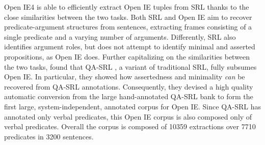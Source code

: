 Open IE4 is able to efficiently extract Open IE tuples from SRL thanks to
the close similarities between the two tasks.
Both SRL and Open IE aim to recover predicate-argument structures from sentences, extracting frames consisting
of a single predicate and a varying number of arguments.
Differently, SRL also identifies argument roles, but does not attempt
to identify minimal and asserted propositions, as Open IE does.
Further capitalizing on the similarities between the two tasks,  found that QA-SRL \cite{hequestion}, a variant of traditional SRL, fully subsumes Open IE. In particular, they showed how assertedness and minimality \emph{can} be recovered from QA-SRL annotations. Consequently, they devised a high quality automatic conversion from the large hand-annotated QA-SRL bank to form the first
large, system-independent, annotated corpus for Open IE.
Since QA-SRL has annotated only verbal predicates, this Open IE corpus is also composed only of verbal predicates.
Overall the corpus is composed of 10359 extractions over 7710 predicates in 3200 sentences.



